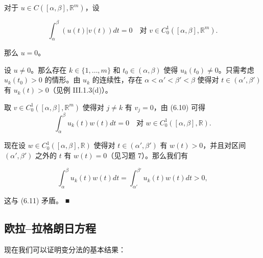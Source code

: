\begin{lemma}

对于 $ u \in C([\alpha, \beta], \mathbb{R}^{m}) $，设

\begin{equation}
\int_{\alpha}^{\beta}(u(t)|v(t)) dt = 0 \quad \text{对 } v \in C_{0}^{1}([\alpha, \beta], \mathbb{R}^{m}) .\tag{6.10}
\end{equation}

那么 $ u = 0 $。

\proofhead
设 $ u \ne 0 $。那么存在 $ k \in \{1, \ldots, m\} $ 和 $ t_{0} \in (\alpha, \beta) $ 使得 $ u_{k}(t_{0}) \ne 0 $。只需考虑 $ u_{k}(t_{0}) > 0 $ 的情形。由 $ u_{k} $ 的连续性，存在 $ \alpha < \alpha' < \beta' < \beta $ 使得对 $ t \in (\alpha', \beta') $ 有 $ u_{k}(t) > 0 $（见例 III.1.3(d)）。

取 $ v \in C_{0}^{1}([\alpha, \beta], \mathbb{R}^{m}) $ 使得对 $ j \ne k $ 有 $ v_{j} = 0 $，由 (6.10) 可得
\begin{equation}
\int_{\alpha}^{\beta}u_{k}(t)w(t) dt = 0 \quad \text{对 } w \in C_{0}^{1}([\alpha, \beta], \mathbb{R}) .\tag{6.11}
\end{equation}

现在设 $ w \in C_{0}^{1}([\alpha, \beta], \mathbb{R}) $ 使得对 $ t \in (\alpha', \beta') $ 有 $ w(t) > 0 $，并且对区间 $ (\alpha', \beta') $ 之外的 $ t $ 有 $ w(t) = 0 $（见习题 7）。那么我们有

\[
\int_{\alpha}^{\beta}u_{k}(t)w(t) dt = \int_{\alpha'}^{\beta'}u_{k}(t)w(t) dt > 0 ,
\]

这与 (6.11) 矛盾。 \nobreak\hspace{0.35em}■

\end{lemma}

\subsection*{欧拉–拉格朗日方程}

现在我们可以证明变分法的基本结果：

